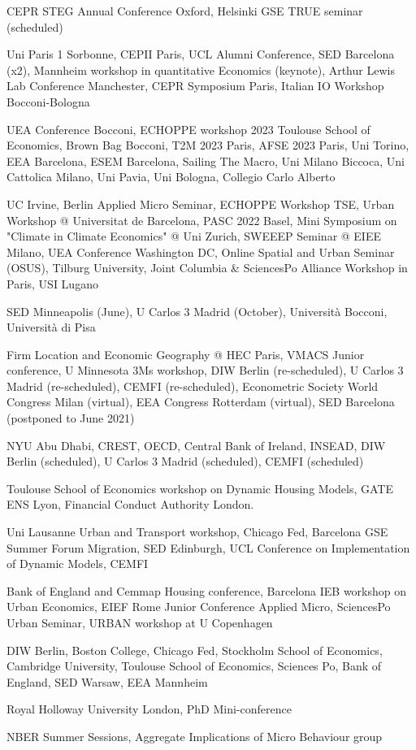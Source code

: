 \documentclass[letterpaper]{article}
\renewenvironment{itemize}{
  \begin{list}{}{
    \setlength{\leftmargin}{1.5em}
  }
}{
  \end{list}
}
\begin{document}
\begin{itemize}
\item[2025:] CEPR STEG Annual Conference Oxford, Helsinki GSE TRUE seminar (scheduled)
\item[2024:] Uni Paris 1 Sorbonne, CEPII Paris, UCL Alumni Conference, SED Barcelona (x2), Mannheim workshop in quantitative Economics (keynote), Arthur Lewis Lab Conference Manchester, CEPR Symposium Paris, Italian IO Workshop Bocconi-Bologna
\item[2023:] UEA Conference Bocconi, ECHOPPE workshop 2023 Toulouse School of Economics, Brown Bag Bocconi, T2M 2023 Paris, AFSE 2023 Paris, Uni Torino, EEA Barcelona, ESEM Barcelona, Sailing The Macro, Uni Milano Biccoca, Uni Cattolica Milano, Uni Pavia, Uni Bologna, Collegio Carlo Alberto 
\item[2022:] UC Irvine, Berlin Applied Micro Seminar, ECHOPPE Workshop TSE, Urban Workshop @ Universitat de Barcelona, PASC 2022 Basel, Mini Symposium on "Climate in Climate Economics" @ Uni Zurich, SWEEEP Seminar @ EIEE Milano, UEA Conference Washington DC, Online Spatial and Urban Seminar (OSUS), Tilburg University, Joint Columbia \& SciencesPo Alliance Workshop in Paris, USI Lugano    
\item[2021:] SED Minneapolis (June), U Carlos 3 Madrid (October), Università Bocconi, Università di Pisa
\item[2020:] Firm Location and Economic Geography @ HEC Paris, VMACS Junior conference, U Minnesota 3Ms workshop, DIW Berlin (re-scheduled), U Carlos 3 Madrid (re-scheduled), CEMFI (re-scheduled), Econometric Society World Congress Milan (virtual), EEA Congress Rotterdam (virtual), SED Barcelona (postponed to June 2021)
\item[2019:] NYU Abu Dhabi, CREST, OECD, Central Bank of Ireland, INSEAD, DIW Berlin (scheduled), U Carlos 3 Madrid (scheduled), CEMFI (scheduled)
\item[2018:] Toulouse School of Economics workshop on Dynamic Housing Models, GATE ENS Lyon, Financial Conduct Authority London.
\item[2017:] Uni Lausanne Urban and Transport workshop, Chicago Fed, Barcelona GSE Summer Forum Migration, SED Edinburgh, UCL Conference on Implementation of Dynamic Models, CEMFI
\item[2016:] Bank of England and Cemmap Housing conference, Barcelona IEB workshop on Urban Economics, EIEF Rome Junior Conference Applied Micro, SciencesPo Urban Seminar, URBAN workshop at U Copenhagen
\item[2015:] DIW Berlin, Boston College, Chicago Fed, Stockholm School of Economics, Cambridge University, Toulouse School of Economics, Sciences Po, Bank of England, SED Warsaw, EEA Mannheim
\item[2014:] Royal Holloway University London, PhD Mini-conference
\item[2013:] NBER Summer Sessions, Aggregate Implications of Micro Behaviour group
\end{itemize}
\end{document}
